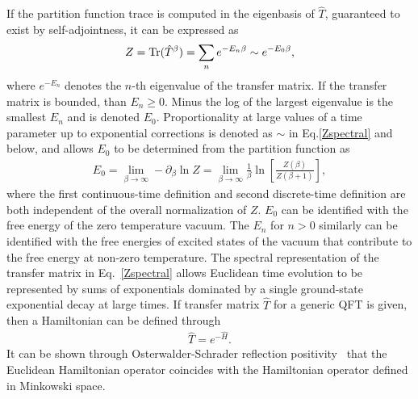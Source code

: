 If the partition function trace is computed in the eigenbasis of $\hat{T}$, guaranteed to exist by self-adjointness, it can be expressed as
\begin{equation}
  \begin{split}
    Z = \text{Tr}(\hat{T}^\beta) = \sum_n e^{-E_n \beta}\sim e^{-E_0 \beta},
  \end{split}\label{Zspectral}
\end{equation}
where $e^{-E_n}$ denotes the $n$-th eigenvalue of the transfer matrix. 
If the transfer matrix is bounded, than $E_n \geq 0$.
Minus the log of the largest eigenvalue is the smallest $E_n$ and is denoted $E_0$.
Proportionality at large values of a time parameter up to exponential corrections is denoted as $\sim$ in Eq.\eqref{Zspectral} and below, and allows $E_0$ to be determined from the partition function as
\begin{equation}
  \begin{split}
    E_0 = \lim_{\beta\rightarrow \infty} -\partial_\beta \ln Z = \lim_{\beta\rightarrow\infty} \frac{1}{\beta}\ln\left[ \frac{Z(\beta)}{Z(\beta+1)} \right],
  \end{split}\label{ZEM}
\end{equation}
where the first continuous-time definition and second discrete-time definition are both independent of the overall normalization of $Z$.
$E_0$ can be identified with the free energy of the zero temperature vacuum.
The $E_n$ for $n>0$ similarly can be identified with the free energies of excited states of the vacuum that contribute to the free energy at non-zero temperature.
The spectral representation of the transfer matrix in Eq.~\eqref{Zspectral} allows Euclidean time evolution to be represented by sums of exponentials dominated by a single ground-state exponential decay at large times.
If transfer matrix $\hat{T}$ for a generic QFT is given, then a Hamiltonian can be defined through
\begin{equation}
  \begin{split}
    \hat{T} = e^{-\hat{H}}.
  \end{split}\label{THdef}
\end{equation}
It can be shown through Osterwalder-Schrader reflection positivity~\cite{Osterwalder:1973dx} that the Euclidean Hamiltonian operator coincides with the Hamiltonian operator defined in Minkowski space.

